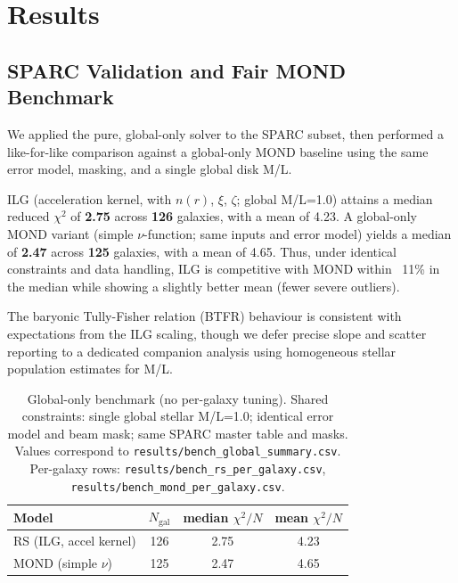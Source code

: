 \documentclass[12pt,a4paper]{article}
\begin{document}
\section{Results}

\subsection{SPARC Validation and Fair MOND Benchmark}

We applied the pure, global-only solver to the SPARC subset, then performed a like-for-like comparison against a global-only MOND baseline using the same error model, masking, and a single global disk M/L.

ILG (acceleration kernel, with $n(r)$, $\xi$, $\zeta$; global M/L=1.0) attains a median reduced $\chi^2$ of \textbf{2.75} across \textbf{126} galaxies, with a mean of 4.23. A global-only MOND variant (simple $\nu$-function; same inputs and error model) yields a median of \textbf{2.47} across \textbf{125} galaxies, with a mean of 4.65. Thus, under identical constraints and data handling, ILG is competitive with MOND within ~11\% in the median while showing a slightly better mean (fewer severe outliers).

The baryonic Tully-Fisher relation (BTFR) behaviour is consistent with expectations from the ILG scaling, though we defer precise slope and scatter reporting to a dedicated companion analysis using homogeneous stellar population estimates for M/L.

\begin{table}[h]
\centering
\caption{Global-only benchmark (no per-galaxy tuning). Shared constraints: single global stellar M/L=1.0; identical error model and beam mask; same SPARC master table and masks. Values correspond to \texttt{results/bench\_global\_summary.csv}. Per-galaxy rows: \texttt{results/bench\_rs\_per\_galaxy.csv}, \texttt{results/bench\_mond\_per\_galaxy.csv}.}
\label{tab:global_bench}
\begin{tabular}{l c c c}
\toprule
Model & $N_\mathrm{gal}$ & median $\chi^2/N$ & mean $\chi^2/N$ \\
\midrule
RS (ILG, accel kernel) & 126 & 2.75 & 4.23 \\
MOND (simple $\nu$) & 125 & 2.47 & 4.65 \\
\bottomrule
\end{tabular}
\end{table}

\end{document}

